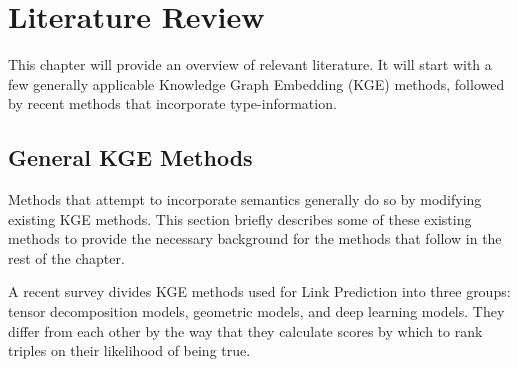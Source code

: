 \chapter{Literature Review}
\label{ch:literature_review}


This chapter will provide an overview of relevant literature. It will start with a few generally applicable Knowledge Graph Embedding (KGE) methods, followed by recent methods that incorporate type-information.

\section{General KGE Methods}

Methods that attempt to incorporate semantics generally do so by modifying existing KGE methods. This section briefly describes some of these existing methods to provide the necessary background for the methods that follow in the rest of the chapter.

A recent survey  divides KGE methods used for Link Prediction into three groups: tensor decomposition models, geometric models, and deep learning models. 
They differ from each other by the way that they calculate scores by which to rank triples on their likelihood of being true. 

